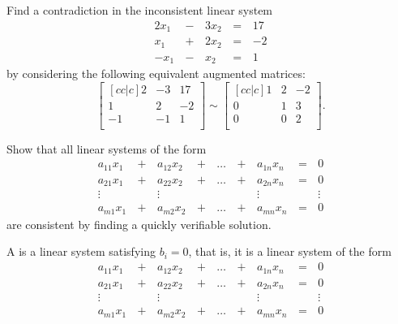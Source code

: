 \begin{applicationActivities}{3}{5}
\begin{activity}{10} %
  Find a contradiction in the inconsistent linear system
    \begin{alignat*}{4}
      2x_1 &\,-\,& 3x_2 &\,=\,& 17 \\
       x_1 &\,+\,& 2x_2 &\,=\,& -2 \\
      -x_1 &\,-\,&  x_2 &\,=\,& 1
    \end{alignat*}
  by considering the following equivalent augmented matrices:
  \[
    \begin{bmatrix}[cc|c]
       2 & -3 & 17 \\
       1 &  2 & -2 \\
      -1 & -1 &  1 \\
    \end{bmatrix}\sim
    \begin{bmatrix}[cc|c]
       1 &  2 & -2 \\
       0 &  1 &  3 \\
       0 &  0 &  2 \\
    \end{bmatrix}
  .\]
\end{activity}

\begin{activity}{5}
  Show that all linear systems of the form
  \begin{alignat*}{5}
    a_{11}x_1 &\,+\,& a_{12}x_2 &\,+\,& \dots  &\,+\,& a_{1n}x_n &\,=\,& 0 \\
    a_{21}x_1 &\,+\,& a_{22}x_2 &\,+\,& \dots  &\,+\,& a_{2n}x_n &\,=\,& 0 \\
     \vdots&  &\vdots&   &&  &\vdots&&\vdots  \\
    a_{m1}x_1 &\,+\,& a_{m2}x_2 &\,+\,& \dots  &\,+\,& a_{mn}x_n &\,=\,& 0
  \end{alignat*}
  are consistent by finding a
  quickly verifiable solution.
\end{activity}

\begin{definition}
  A  is a linear system satisfying \(b_i=0\), that is,
  it is a linear system of the form
  \begin{alignat*}{5}
    a_{11}x_1 &\,+\,& a_{12}x_2 &\,+\,& \dots  &\,+\,& a_{1n}x_n &\,=\,& 0 \\
    a_{21}x_1 &\,+\,& a_{22}x_2 &\,+\,& \dots  &\,+\,& a_{2n}x_n &\,=\,& 0 \\
     \vdots&  &\vdots&   &&  &\vdots&&\vdots  \\
    a_{m1}x_1 &\,+\,& a_{m2}x_2 &\,+\,& \dots  &\,+\,& a_{mn}x_n &\,=\,& 0
  \end{alignat*}
\end{definition}


\end{applicationActivities}
